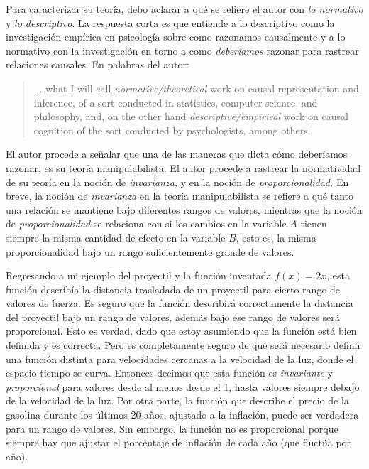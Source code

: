 Para caracterizar su teoría, debo aclarar a qué se refiere
el autor con \emph{lo normativo} y \emph{lo descriptivo}. La
respuesta corta es que entiende a lo descriptivo como la
investigación empírica en psicología sobre como razonamos
causalmente y a lo normativo con la investigación en torno a
como \emph{deberíamos} razonar para rastrear relaciones
causales. En palabras del autor:

\begin{quote} 
  $\ldots$ what I will call \emph{normative/theoretical}
  work on causal representation and inference, of a sort
  conducted in statistics, computer science, and philosophy,
  and, on the other hand \emph{descriptive/empirical} work
  on causal cognition of the sort conducted by
  psychologists, among others. \parencite[p.~15]{caushuman}
\end{quote}

El autor procede a señalar que una de las maneras que dicta
cómo deberíamos razonar, es su teoría manipulabilista. El
autor procede a rastrear la normatividad de su teoría en la
noción de \emph{invarianza,} y en la noción de
\emph{proporcionalidad.} En breve, la noción de
\emph{invarianza} en la teoría manipulabilista se refiere a
qué tanto una relación se mantiene bajo diferentes rangos
de valores, mientras que la noción de
\emph{proporcionalidad} se relaciona con si los cambios en
la variable $ A $ tienen siempre la misma cantidad de efecto
en la variable $ B $, esto es,  la misma proporcionalidad
bajo un rango suficientemente grande de valores. 


Regresando a mi ejemplo del proyectil y la función inventada
$ f(x) = 2x $, esta función describía la distancia
trasladada de un proyectil para cierto rango de valores de
fuerza. Es seguro que la función describirá correctamente la
distancia del proyectil bajo un rango de valores, además
bajo ese rango de valores será proporcional. Esto es verdad,
dado que estoy
asumiendo que la función está bien definida y es correcta.
Pero es completamente seguro de que será necesario definir
una función distinta para velocidades cercanas a la
velocidad de la luz, donde el espacio-tiempo se curva.
Entonces decimos que esta función es \emph{invariante} y
\emph{proporcional} para valores desde al menos desde el 1, hasta
valores siempre debajo de la velocidad de la luz. Por otra
parte, la función que describe el precio de la gasolina
durante los últimos 20 años, ajustado a la inflación, puede
ser verdadera para un rango de valores. Sin embargo, la
función no es
proporcional porque siempre hay que ajustar el porcentaje de
inflación de cada año (que fluctúa por año).

